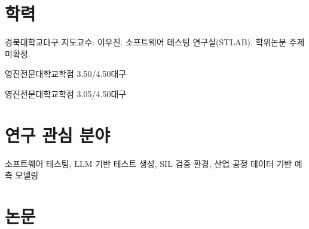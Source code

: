 \documentclass[korean,small]{cv}
\begin{document}
\makecvheader

\section{학력}
  {경북대학교}{대구}
  {지도교수: 이우진. 소프트웨어 테스팅 연구실(STLAB). 학위논문 주제 미확정.}

  {영진전문대학교}{학점 3.50/4.50\cvsep 대구}{}

  {영진전문대학교}{학점 3.05/4.50\cvsep 대구}{}


\section{연구 관심 분야}
소프트웨어 테스팅, LLM 기반 테스트 생성, SIL 검증 환경, 산업 공정 데이터 기반 예측 모델링

\section{논문 }

\end{document}
